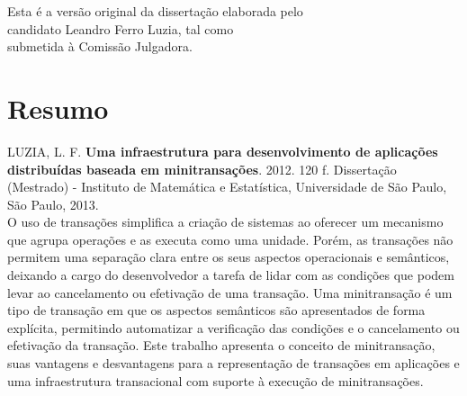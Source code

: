 \documentclass[11pt,twoside,a4paper]{book}
\begin{document}
    \vskip 2cm

    \begin{flushright}
	Esta é a versão original da dissertação elaborada pelo\\
	candidato Leandro Ferro Luzia, tal como \\
	submetida à Comissão Julgadora.
    \end{flushright}

\pagebreak



\chapter*{Resumo}

\noindent LUZIA, L. F. \textbf{Uma infraestrutura para desenvolvimento de aplicações distribuídas baseada em minitransações}. 
2012. 120 f.
Dissertação (Mestrado) - Instituto de Matemática e Estatística,
Universidade de São Paulo, São Paulo, 2013.
\\

O uso de transações simplifica a criação de sistemas ao oferecer um mecanismo que agrupa operações e as executa como uma unidade. Porém, as transações não permitem uma separação clara entre os seus aspectos operacionais e semânticos, deixando a cargo do desenvolvedor a tarefa de lidar com as condições que podem levar ao cancelamento ou efetivação de uma transação. Uma minitransação é um tipo de transação em que os aspectos semânticos são apresentados de forma explícita, permitindo automatizar a verificação das condições e o cancelamento ou efetivação da transação. Este trabalho apresenta o conceito de minitransação, suas vantagens e desvantagens para a representação de transações em aplicações e uma infraestrutura transacional com suporte à execução de minitransações. %
\\
\end{document}
